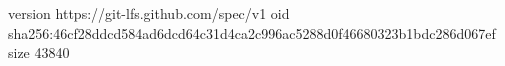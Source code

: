 version https://git-lfs.github.com/spec/v1
oid sha256:46cf28ddcd584ad6dcd64c31d4ca2c996ac5288d0f46680323b1bdc286d067ef
size 43840
